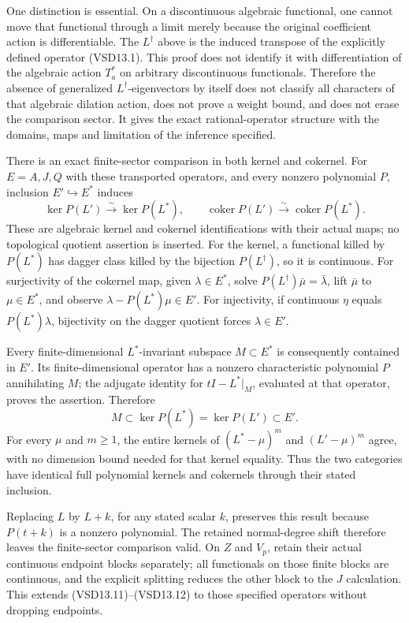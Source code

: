 One distinction is essential. On a discontinuous algebraic functional,
one cannot move that functional through a limit merely because the
original coefficient action is differentiable. The \(L^\dagger\) above
is the induced transpose of the explicitly defined operator (VSD13.1).
This proof does not identify it with differentiation of the algebraic
action \(T_a^*\) on arbitrary discontinuous functionals. Therefore the
absence of generalized \(L^\dagger\)-eigenvectors by itself does not
classify all characters of that algebraic dilation action, does not
prove a weight bound, and does not erase the comparison sector. It gives
the exact rational-operator structure with the domains, maps and
limitation of the inference specified.

There is an exact finite-sector comparison in both kernel and cokernel.
For \(E=A,J,Q\) with these transported operators, and every nonzero
polynomial \(P\), inclusion \(E'\hookrightarrow E^*\) induces \[
\boxed{
\ker P(L')\xrightarrow{\sim}\ker P(L^*),\qquad
\operatorname{coker}P(L')\xrightarrow{\sim}
\operatorname{coker}P(L^*).}
\tag{VSD13.11}
\] These are algebraic kernel and cokernel identifications with their
actual maps; no topological quotient assertion is inserted. For the
kernel, a functional killed by \(P(L^*)\) has dagger class killed by the
bijection \(P(L^\dagger)\), so it is continuous. For surjectivity of the
cokernel map, given \(\lambda\in E^*\), solve
\(P(L^\dagger)\bar\mu=\bar\lambda\), lift \(\bar\mu\) to \(\mu\in E^*\),
and observe \(\lambda-P(L^*)\mu\in E'\). For injectivity, if continuous
\(\eta\) equals \(P(L^*)\lambda\), bijectivity on the dagger quotient
forces \(\lambda\in E'\).

Every finite-dimensional \(L^*\)-invariant subspace \(M\subset E^*\) is
consequently contained in \(E'\). Its finite-dimensional operator has a
nonzero characteristic polynomial \(P\) annihilating \(M\); the adjugate
identity for \(tI-L^*|_M\), evaluated at that operator, proves the
assertion. Therefore \[
\boxed{M\subset\ker P(L^*)=\ker P(L')\subset E'.}
\tag{VSD13.12}
\] For every \(\mu\) and \(m\ge1\), the entire kernels of
\((L^*-\mu)^m\) and \((L'-\mu)^m\) agree, with no dimension bound needed
for that kernel equality. Thus the two categories have identical full
polynomial kernels and cokernels through their stated inclusion.

Replacing \(L\) by \(L+k\), for any stated scalar \(k\), preserves this
result because \(P(t+k)\) is a nonzero polynomial. The retained
normal-degree shift therefore leaves the finite-sector comparison valid.
On \(Z\) and \(V_p\), retain their actual continuous endpoint blocks
separately; all functionals on those finite blocks are continuous, and
the explicit splitting reduces the other block to the \(J\) calculation.
This extends (VSD13.11)--(VSD13.12) to those specified operators without
dropping endpoints.

